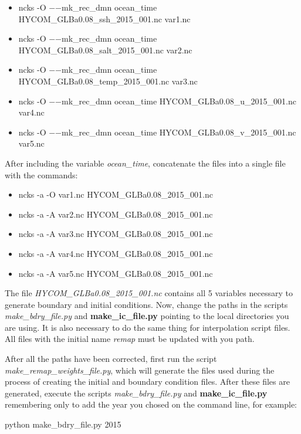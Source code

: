 \begin{itemize}
    \item ncks -O  $-$$-$mk\_rec\_dmn ocean\_time HYCOM\_GLBa0.08\_ssh\_2015\_001.nc  var1.nc
    \item ncks -O $-$$-$mk\_rec\_dmn ocean\_time HYCOM\_GLBa0.08\_salt\_2015\_001.nc  var2.nc
    \item ncks -O $-$$-$mk\_rec\_dmn ocean\_time HYCOM\_GLBa0.08\_temp\_2015\_001.nc  var3.nc    
    \item ncks -O $-$$-$mk\_rec\_dmn ocean\_time HYCOM\_GLBa0.08\_u\_2015\_001.nc  var4.nc
    \item ncks -O $-$$-$mk\_rec\_dmn ocean\_time HYCOM\_GLBa0.08\_v\_2015\_001.nc  var5.nc  
\end{itemize}
\bigskip

After including the variable \textit{ocean\_time}, concatenate the files into a single file with the commands: 
\bigskip

\begin{itemize}
    \item ncks  -a  -O var1.nc  HYCOM\_GLBa0.08\_2015\_001.nc
    \item ncks  -a  -A var2.nc  HYCOM\_GLBa0.08\_2015\_001.nc
    \item ncks  -a  -A var3.nc  HYCOM\_GLBa0.08\_2015\_001.nc
    \item ncks  -a  -A var4.nc  HYCOM\_GLBa0.08\_2015\_001.nc
    \item ncks  -a  -A var5.nc  HYCOM\_GLBa0.08\_2015\_001.nc
\end{itemize}
\bigskip

The file \textit{HYCOM\_GLBa0.08\_2015\_001.nc} contains all 5 variables necessary to generate boundary and initial conditions.
Now, change the paths in the scripts \textit{make\_bdry\_file.py} and \textbf{make\_ic\_file.py} pointing to the local directories you are using. 
It is also necessary to do the same thing for interpolation script files. All files with the initial name \textit{remap} must be updated with you path.
\bigskip

After all the paths have been corrected, first run the script \textit{make\_remap\_weights\_file.py}, which will generate the files 
used during the process of creating the initial and boundary condition files. After these files are generated, execute the scripts \textit{make\_bdry\_file.py} and
\textbf{make\_ic\_file.py} remembering only to add the year you chosed on the command line, for example: 
\bigskip

\begin{bashcode}
python make_bdry_file.py 2015
\end{bashcode}
\bigskip
    
